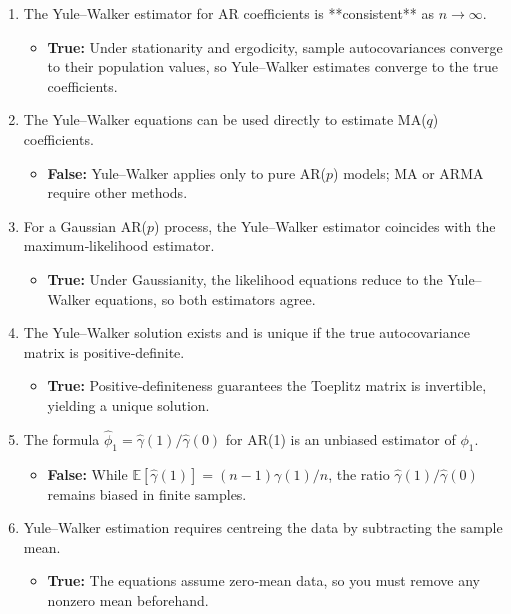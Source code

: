 \documentclass{article}
\begin{document}
\begin{enumerate}
  \item The Yule–Walker estimator for AR coefficients is **consistent** as $n\to\infty$.
  \begin{itemize}
    \item \textbf{True:} Under stationarity and ergodicity, sample autocovariances converge to their population values, so Yule–Walker estimates converge to the true coefficients.
  \end{itemize}

  \item The Yule–Walker equations can be used directly to estimate MA($q$) coefficients.
  \begin{itemize}
    \item \textbf{False:} Yule–Walker applies only to pure AR($p$) models; MA or ARMA require other methods.
  \end{itemize}

  \item For a Gaussian AR($p$) process, the Yule–Walker estimator coincides with the maximum‐likelihood estimator.
  \begin{itemize}
    \item \textbf{True:} Under Gaussianity, the likelihood equations reduce to the Yule–Walker equations, so both estimators agree.
  \end{itemize}

  \item The Yule–Walker solution exists and is unique if the true autocovariance matrix is positive‐definite.
  \begin{itemize}
    \item \textbf{True:} Positive‐definiteness guarantees the Toeplitz matrix is invertible, yielding a unique solution.
  \end{itemize}

  \item The formula $\hat\phi_1 = \hat\gamma(1)/\hat\gamma(0)$ for AR(1) is an unbiased estimator of $\phi_1$.
  \begin{itemize}
    \item \textbf{False:} While $\mathbb{E}[\hat\gamma(1)] = (n-1)\gamma(1)/n$, the ratio $\hat\gamma(1)/\hat\gamma(0)$ remains biased in finite samples.
  \end{itemize}

  \item Yule–Walker estimation requires centreing the data by subtracting the sample mean.
  \begin{itemize}
    \item \textbf{True:} The equations assume zero‐mean data, so you must remove any nonzero mean beforehand.
  \end{itemize}


\end{enumerate}
\end{document}
